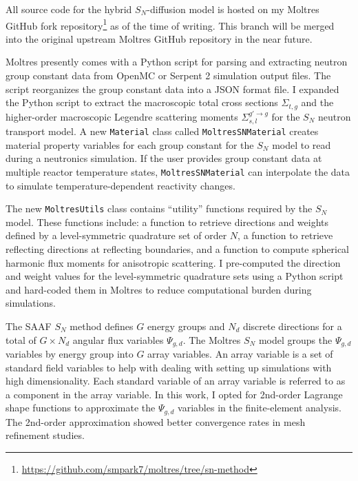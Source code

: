 All source code for the hybrid $S_N$-diffusion model is hosted on my Moltres GitHub fork
repository\footnote{\url{https://github.com/smpark7/moltres/tree/sn-method}} as of the time of
writing. This branch will be merged into the original upstream Moltres GitHub repository in the near
future.

Moltres presently comes with a Python script for parsing and extracting neutron group constant data
from OpenMC \cite{boyd_multigroup_2019} or Serpent 2 \cite{leppanen_serpent_2014} simulation
output files. The script reorganizes the group constant data into a
JSON format file. I expanded the Python script to extract
the macroscopic total cross sections $\Sigma_{t,g}$ and the higher-order macroscopic Legendre
scattering moments $\Sigma^{g'\rightarrow g}_{s,l}$ for the $S_N$ neutron transport model. A new
\texttt{Material} class called \texttt{MoltresSNMaterial} creates material
property variables for each group constant for the $S_N$ model to read during a neutronics
simulation. If the user provides group constant data at multiple reactor temperature states,
\texttt{MoltresSNMaterial} can interpolate the data to simulate temperature-dependent reactivity
changes.

The new \texttt{MoltresUtils} class contains ``utility'' functions required by the $S_N$ model.
These functions include: a function to retrieve directions and weights defined by a
level-symmetric quadrature set of order $N$, a function to retrieve reflecting directions at
reflecting boundaries, and a function to compute spherical harmonic flux moments for anisotropic
scattering. I pre-computed the direction and weight values for the level-symmetric quadrature sets
using a Python script and hard-coded them in Moltres to reduce computational burden during
simulations.

The \gls{SAAF} $S_N$ method defines $G$ energy groups and $N_d$ discrete directions for a total
of $G\times N_d$ angular flux variables $\Psi_{g,d}$. The Moltres $S_N$ model groups the
$\Psi_{g,d}$ variables by energy group into $G$ array variables. An array variable is a
set of standard field variables to help with dealing with setting up simulations with high
dimensionality. Each standard variable of an array variable is referred to as a component in the
array variable. In this work, I opted for
2nd-order Lagrange shape functions to approximate the $\Psi_{g,d}$ variables in the finite-element
analysis. The 2nd-order approximation showed better convergence rates in mesh refinement studies.

